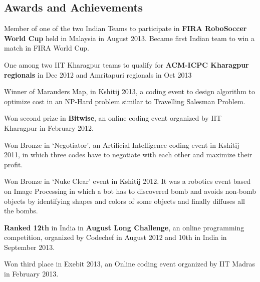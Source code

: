 \documentclass[hidelinks,margin,line,10pt,a4paper]{resume}
\begin{document}
\begin{resume}
\section{\mysidestyle Awards and Achievements}
\begin {list2}
\item Member of one of the two Indian Teams to participate in \textbf{FIRA RoboSoccer World Cup} held in Malaysia in August 2013. Became first Indian team to win a match in FIRA World Cup.\vspace{1mm}%
\item One among two IIT Kharagpur teams to qualify for \textbf{ACM-ICPC Kharagpur regionals} in Dec 2012 and Amritapuri regionals in Oct 2013\vspace{1mm}%
\item Winner of Marauders Map, in Kshitij 2013, a coding event to design algorithm to optimize cost in an NP-Hard problem similar to Travelling Salesman Problem.\vspace{1mm}%
\item Won second prize in \textbf{Bitwise}, an online coding event organized by IIT Kharagpur in February 2012.\vspace{1mm}%
\item Won Bronze in ‘Negotiator’, an Artificial Intelligence coding event in Kshitij 2011, in which three codes have to negotiate with each other and maximize their profit.\vspace{1mm}%
\item Won Bronze in ‘Nuke Clear’ event in Kshitij 2012. It was a robotics event based on Image Processing in which a bot has to discovered bomb and avoids non-bomb objects by identifying shapes and colors of some objects and finally diffuses all the bombs.\vspace{1mm}%
\item \textbf{Ranked 12th} in India in \textbf{August Long Challenge}, an online programming competition, organized by Codechef in August 2012 and 10th in India in September 2013.\vspace{1mm}%
\item Won third place in Exebit 2013, an Online coding event organized by IIT Madras in February 2013.\vspace{1mm}%

\end {list2}



\end{resume}
\end{document}
